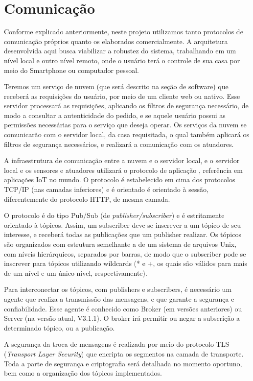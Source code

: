 \section{Comunicação}
Conforme explicado anteriormente, neste projeto utilizamos tanto protocolos de comunicação próprios quanto os elaborados comercialmente. A arquitetura desenvolvida aqui busca viabilizar a robustez do sistema, trabalhando em um nível local e outro nível remoto, onde o usuário terá o controle de sua casa por meio do Smartphone ou computador pessoal.

Teremos um serviço de nuvem (que será descrito na seção de software) que receberá as requisições do usuário, por meio de um cliente web ou nativo. Esse servidor processará as requisições, aplicando os filtros de segurança necessário, de modo a consultar a autenticidade do pedido, e se aquele usuário possui as permissões necessárias para o serviço que deseja operar. Os serviços da nuvem se comunicarão com o servidor local, da casa requisitada, o qual também aplicará os filtros de segurança necessários, e realizará a comunicação com os atuadores.

A infraestrutura de comunicação entre a nuvem e o servidor local, e o servidor local e os sensores e atuadores utilizará o protocolo de aplicação \wmqtt{}, referência em aplicações IoT no mundo. O protocolo \wmqtt{} é estabelecido em cima dos protocolos TCP/IP (nas camadas inferiores) e é orientado é orientado à sessão, diferentemente do protocolo HTTP, de mesma camada.

O protocolo \wmqtt{} é do tipo Pub/Sub (de \textit{publisher/subscriber}) e é estritamente orientado à tópicos. Assim, um subscriber deve se inscrever a um tópico de seu interesse, e receberá todas as publicações que um publisher realizar. Os tópicos são organizados com estrutura semelhante a de um sistema de arquivos Unix, com níveis hierárquicos, separados por barras, de modo que o subscriber pode se inscrever para tópicos utilizando wildcards (* e +, os quais são válidos para mais de um nível e um único nível, respectivamente).

Para interconectar os tópicos, com publishers e subscribers, é necessário um agente que realiza a transmissão das mensagens, e que garante a segurança e confiabilidade. Esse agente é conhecido como Broker (em versões anteriores) ou Server (na versão atual, V3.1.1). O broker irá permitir ou negar a subscrição a determinado tópico, ou a publicação.

A segurança da troca de mensagens é realizada por meio do protocolo TLS (\textit{Transport Layer Security}) que encripta os segmentos na camada de transporte. Toda a parte de segurança e criptografia será detalhada no momento oportuno, bem como a organização dos tópicos implementados.

